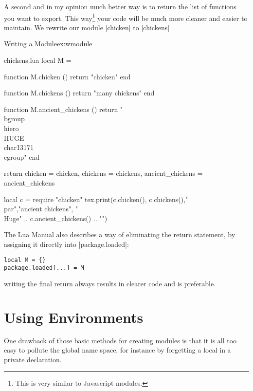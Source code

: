 A second and in my opinion much better way is to return the list of functions you want to export. This way\footnote{This is very similar to Javascript modules.} your code will be much more cleaner and easier to maintain. We rewrite our module |chicken|  to |chickens|

\begin{texexample}{Writing a Module}{ex:wmodule}
\begin{filecontents*}{chickens.lua}
local M = {}

function M.chicken ()
  return "chicken"
end

function M.chickens ()
  return "many chickens" 
end

function M.ancient_chickens ()
  return "\\bgroup\\hiero\\HUGE\\char\"13171 \\egroup"
end

return {chicken           = chicken,
        chickens          = chickens,
        ancient_chickens  = ancient_chickens}
\end{filecontents*}

\begin{luacode*}
   local c = require "chicken"
   tex.print(c.chicken(), c.chickens(),"\\par","ancient chickens", "{\\Huge" .. c.ancient_chickens() .. "}")
\end{luacode*}
\end{texexample}



The Lua Manual also describes a way of eliminating the return statement, by assigning it directly into |package.loaded|:

\begin{verbatim}
local M = {}
package.loaded[...] = M
\end{verbatim}

writing the final return always results in clearer code and is preferable.

\section{Using Environments}

One drawback of those basic methods for creating modules is that it is all too easy to pollute the global name space, for instance by forgetting a local in a private declaration.

